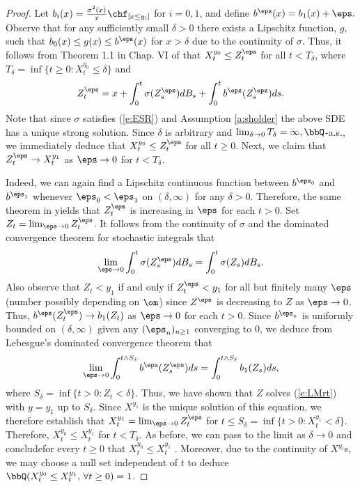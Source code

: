 \documentclass[11pt,reqno]{amsart}
\numberwithin{equation}{section}
\def\rar{\rightarrow}
\begin{document}
\begin{proof}
Let $b_i(x)=\frac{\sigma^2(x)}{x}\chf_{[x\leq y_i]}$ for $i=0,1$, and define $b^{\eps}(x)=b_1(x)+\eps.$ Observe that for any sufficiently small $\delta >0$  there exists a Lipschitz function, $g$, such that $b_0(x) \leq g(x)\leq b^{\eps}(x)$ for $x > \delta$ due to the continuity of $\sigma$. Thus, it follows from Theorem 1.1 in Chap. VI of \cite{IW} that $X^{y_0}_t \leq Z^{\eps}_t$ for all $t <T_{\delta}$, where $T_{\delta}=\inf\{t\geq 0: X^{y_0}_t  \leq \delta\}$ and
\[
Z^{\eps}_t =x + \int_0^t \sigma(Z^{\eps}_s)dB_s + \int_0^t b^{\eps}(Z^{\eps}_s)ds.
\]
Note that since $\sigma$ satisfies (\ref{e:ESR}) and Assumption \ref{a:sholder} the above SDE has a unique strong solution. Since $\delta$ is arbitrary and $\lim_{\delta\rar 0}T_{\delta}=\infty, \bbQ$-a.s., we immediately deduce that $X^{y_0}_t \leq Z^{\eps}_t$ for all $t\geq 0$.  Next, we claim that $Z^{\eps}_t \rar X^{y_1}_t$ as $\eps \rar 0$ for $t <T_{\delta}$. 

Indeed, we can again find a Lipschitz continuous function between $b^{\eps_0}$ and $b^{\eps_1}$ whenever $\eps_0<\eps_1$ on $(\delta, \infty)$ for any $\delta >0$. Therefore, the same theorem in \cite{IW} yields that $Z^{\eps}_t$ is increasing in $\eps$ for each $t>0$. Set $Z_t=\lim_{\eps \rar 0}Z^{\eps}_t$. It follows from the continuity of $\sigma$ and the  dominated convergence theorem for stochastic integrals that
\[
\lim_{\eps \rar 0}\int_0^t \sigma(Z^{\eps}_s)dB_s=\int_0^t \sigma(Z_s)dB_s.
\]
Also observe that $Z_t <y_1$ if and only if $Z^{\eps}_t<y_1$ for all but finitely many $\eps$ (number possibly depending on $\om$) since $Z^\eps$ is decreasing to $Z$ as $\eps \rar 0$. Thus, $b^{\eps}(Z^{\eps}_t)\rar b_1(Z_t)$ as $\eps \rar 0$ for each $t>0$. Since $b^{\eps_n}$ is uniformly bounded on $(\delta, \infty)$ given any $(\eps_n)_{n \geq 1}$ converging to $0$, we deduce from Lebesgue's dominated convergence theorem that
\[
\lim_{\eps \rar 0}\int_0^{t\wedge S_{\delta}} b^{\eps}(Z^{\eps}_s)ds= \int_0^{t\wedge S_{\delta}}  b_1(Z_s)ds,
\]
where $ S_{\delta}=\inf\{t>0:Z_t <\delta\}$. Thus, we have shown that $Z$ solves (\ref{e:LMrt}) with $y=y_1$ up to  $S_{\delta}$. Since $X^{y_1}$ is the unique solution of this equation, we therefore establish that $X^{y_1}_t=\lim_{\eps \rar 0}Z^{\eps}_t$ for $t \leq S_{\delta}= \inf\{t>0:X^{y_1}_t <\delta\} $.  Therefore,  $X^{y_0}_t \leq X^{y_1}_t$ for $t <T_{\delta}$. As before, we can pass to the limit as $\delta \rar 0$ and concludefor every $t \geq 0$ that   $X^{y_0}_t \leq X^{y_1}_t$ . Moreover, due to the continuity of $X^{y_i}$s, we may choose a null set independent of $t$ to deduce  $\bbQ(X^{y_0}_t\leq X^{y_1}_t, \, \forall t \geq 0)=1$.
\end{proof}
\end{document}
